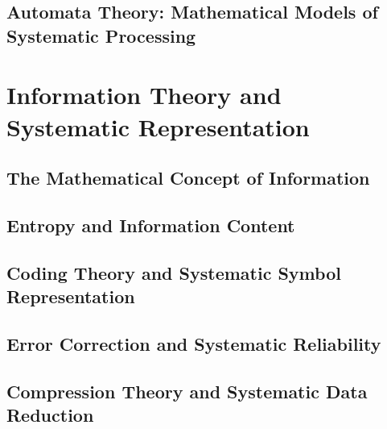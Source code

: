 \documentclass[12pt, oneside, openany]{book}
\let\oldchapter\chapter
\renewcommand{\chapter}{
	\cleardoublepage
	\thispagestyle{chapter}
	\oldchapter
}
\begin{document}
\section{Automata Theory: Mathematical Models of Systematic Processing}


\chapter{Information Theory and Systematic Representation}

\section{The Mathematical Concept of Information}

\section{Entropy and Information Content}

\section{Coding Theory and Systematic Symbol Representation}

\section{Error Correction and Systematic Reliability}

\section{Compression Theory and Systematic Data Reduction}
\end{document}
